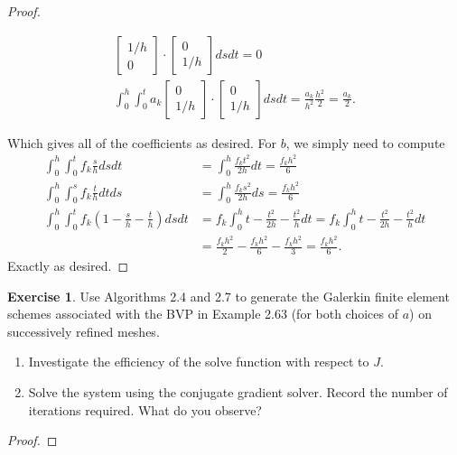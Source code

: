 \documentclass{amsart}
\theoremstyle{plain}
\theoremstyle{definition}
\newtheorem{exer}{Exercise}[section]
\begin{document}
\begin{proof}
\begin{enumerate}[label=\alph*.]
\begin{align*}
\begin{bmatrix}
            1/h\\0
        \end{bmatrix}\cdot\begin{bmatrix}
            0\\1/h
        \end{bmatrix} ds dt = 0\\
        \int_0^h \int_0^t a_k \begin{bmatrix}
            0\\1/h
        \end{bmatrix}\cdot\begin{bmatrix}
            0\\1/h
        \end{bmatrix} ds dt = \frac{a_k}{h^2}\frac{h^2}{2}=\frac{a_k}{2}.
    \end{align*}
\end{enumerate}
Which gives all of the coefficients as desired. For $b$, we simply need to compute
\begin{align*}
    \int_0^h\int_0^t f_k \frac{s}{h} ds dt &= \int_0^h \frac{f_k t^2}{2h}dt = \frac{f_k h^2}{6}\\
    \int_0^h\int_0^s f_k \frac{t}{h} dt ds &= \int_0^h \frac{f_k s^2}{2h}ds = \frac{f_k h^2}{6}\\
    \int_0^h\int_0^t f_k \left(1-\frac{s}{h}-\frac{t}{h}\right) ds dt &= f_k \int_0^h t -\frac{t^2}{2h}-\frac{t^2}{h}dt = f_k \int_0^h t -\frac{t^2}{2h}-\frac{t^2}{h}dt \\
    &= \frac{f_k h^2}{2}-\frac{f_k h^2}{6}-\frac{f_k h^2}{3}=\frac{f_k h^2}{6}.
\end{align*}
    Exactly as desired.
\end{proof}

\begin{exer}
    Use Algorithms 2.4 and 2.7 to generate the Galerkin finite element schemes associated with the BVP in Example 2.63 (for both choices of $a$) on successively refined meshes.
    \begin{enumerate}[label=\alph*.]
        \item Investigate the efficiency of the solve function with respect to $J$.
        \item Solve the system using the conjugate gradient solver. Record the number of iterations required. What do you observe?
    \end{enumerate}
\end{exer}
\begin{proof}
    
\end{proof}

\printbibliography
\end{document}
